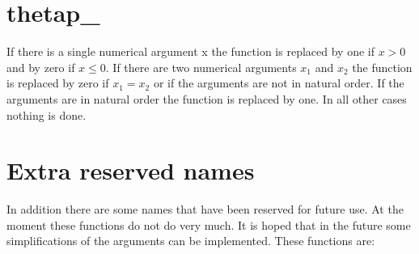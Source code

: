 
\section{thetap\_}
\label{funthetap}
\noindent If there is a single numerical argument x the function is 
replaced by one if $x > 0$ and by zero if $x \le 0$. If there are two 
numerical arguments $x_1$ and $x_2$ the function is replaced by zero if $x_1 
= x_2$ or if the arguments are not in natural order. If the arguments are 
in natural order the function is replaced by one. In all other cases 
nothing is done.



\section{Extra reserved names}

\noindent In addition there are some names that have been reserved for 
future use. At the moment these functions do not do very much. It is hoped 
that in the future some simplifications of the arguments can be 
implemented. These functions are:










